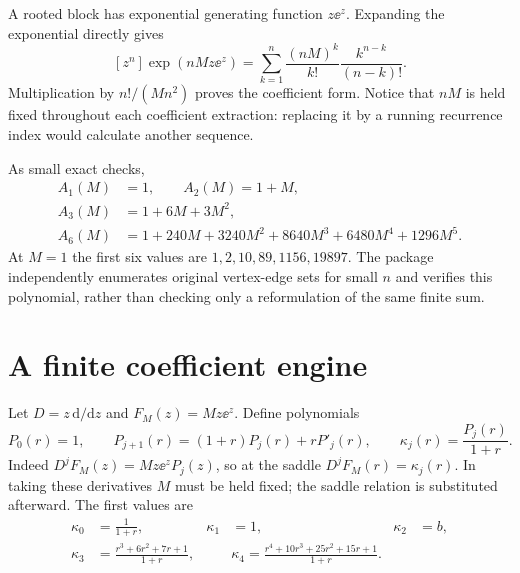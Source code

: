 \documentclass[11pt,letterpaper]{article}
\numberwithin{equation}{section}
\theoremstyle{remark}\newtheorem{remark}[theorem]{Remark}
\begin{document}
A rooted block has exponential generating function $z\ee^z$. Expanding the exponential directly gives
\[
 [z^n]\exp(nMz\ee^z)
 =\sum_{k=1}^n\frac{(nM)^k}{k!}\frac{k^{n-k}}{(n-k)!}.
\]
Multiplication by $n!/(Mn^2)$ proves the coefficient form. Notice that $nM$ is held fixed throughout each coefficient extraction: replacing it by a running recurrence index would calculate another sequence.

As small exact checks,
\begin{align*}
 A_1(M)&=1,\qquad A_2(M)=1+M,\\
 A_3(M)&=1+6M+3M^2,\\
 A_6(M)&=1+240M+3240M^2+8640M^3+6480M^4+1296M^5.
\end{align*}
At $M=1$ the first six values are $1,2,10,89,1156,19897$. The package independently enumerates original vertex-edge sets for small $n$ and verifies this polynomial, rather than checking only a reformulation of the same finite sum.

\section{A finite coefficient engine}\label{fat:sec:coefficients}
Let $D=z\,\mathrm d/\mathrm dz$ and $F_M(z)=Mz\ee^z$. Define polynomials
\begin{equation}\label{fat:eq:P}
 P_0(r)=1,\qquad P_{j+1}(r)=(1+r)P_j(r)+rP'_j(r),
 \qquad \kappa_j(r)=\frac{P_j(r)}{1+r}.
\end{equation}
Indeed $D^jF_M(z)=Mz\ee^zP_j(z)$, so at the saddle $D^jF_M(r)=\kappa_j(r)$. In taking these derivatives $M$ must be held fixed; the saddle relation is substituted afterward. The first values are
\begin{align*}
 \kappa_0&=\frac1{1+r},&\kappa_1&=1,&\kappa_2&=b,\\
 \kappa_3&=\frac{r^3+6r^2+7r+1}{1+r},&&
 \kappa_4=\frac{r^4+10r^3+25r^2+15r+1}{1+r}.
\end{align*}
\end{document}
